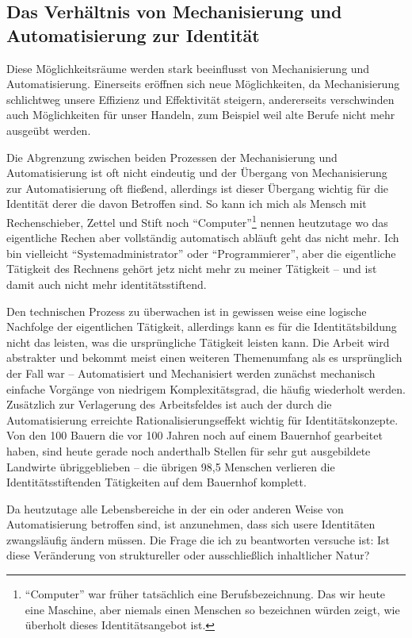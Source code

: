 \subsection {Das Verhältnis von Mechanisierung und Automatisierung zur Identität}

Diese Möglichkeitsräume werden stark beeinflusst von Mechanisierung und Automatisierung.
Einerseits eröffnen sich neue Möglichkeiten, da Mechanisierung schlichtweg unsere Effizienz und Effektivität steigern, andererseits verschwinden auch Möglichkeiten für unser Handeln, zum Beispiel weil alte Berufe nicht mehr ausgeübt werden.

Die Abgrenzung zwischen beiden Prozessen der Mechanisierung und Automatisierung ist oft nicht eindeutig und der Übergang von Mechanisierung zur Automatisierung oft fließend, allerdings ist dieser Übergang wichtig für die Identität derer die davon Betroffen sind.
So kann ich mich als Mensch mit Rechenschieber, Zettel und Stift noch \enquote{Computer}\footnote{\enquote{Computer} war früher tatsächlich eine Berufsbezeichnung. Das wir heute  eine Maschine, aber niemals einen Menschen so bezeichnen würden zeigt, wie überholt dieses Identitätsangebot ist.} nennen heutzutage wo das eigentliche Rechen aber vollständig automatisch abläuft geht das nicht mehr.
Ich bin vielleicht \enquote{Systemadministrator} oder \enquote{Programmierer}, aber die eigentliche Tätigkeit des Rechnens gehört jetz nicht mehr zu meiner Tätigkeit – und ist damit auch nicht mehr identitätsstiftend.

Den technischen Prozess zu überwachen ist in gewissen weise eine logische Nachfolge der eigentlichen Tätigkeit, allerdings kann es für die Identitätsbildung nicht das leisten, was die ursprüngliche Tätigkeit leisten kann.
Die Arbeit wird abstrakter und bekommt meist einen weiteren Themenumfang als es ursprünglich der Fall war \parencite{ulrich} – Automatisiert und Mechanisiert werden zunächst mechanisch einfache Vorgänge von niedrigem Komplexitätsgrad, die häufig wiederholt werden.
Zusätzlich zur Verlagerung des Arbeitsfeldes ist auch der durch die Automatisierung erreichte Rationalisierungseffekt wichtig für Identitätskonzepte.
Von den 100 Bauern die vor 100 Jahren noch auf einem Bauernhof gearbeitet haben, sind heute gerade noch anderthalb Stellen für sehr gut ausgebildete Landwirte übriggeblieben \parencite{arbeitsfrei} – die übrigen 98,5 Menschen verlieren die Identitätsstiftenden Tätigkeiten auf dem Bauernhof komplett.

Da heutzutage alle Lebensbereiche in der ein oder anderen Weise von Automatisierung betroffen sind, ist anzunehmen, dass sich usere Identitäten zwangsläufig ändern müssen.
Die Frage die ich zu beantworten versuche ist: Ist diese Veränderung von struktureller oder ausschließlich inhaltlicher Natur?

